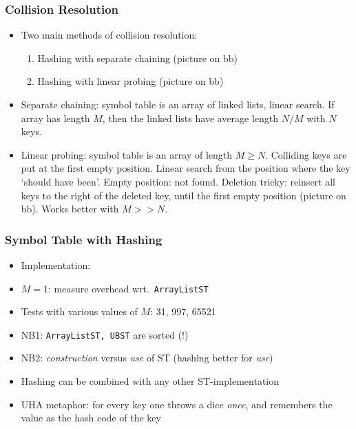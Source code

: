 \documentclass[handout]{beamer}
\newcommand{\git}{https://github.com/marcbezem/INF102/blob/master}
\begin{document}
\begin{frame}
    \frametitle{Collision Resolution}

\begin{itemize}[<+->]
\item Two main methods of collision resolution:
  \begin{enumerate}[<+->]
  \item Hashing with separate chaining (picture on bb)
  \item Hashing with linear probing (picture on bb)
  \end{enumerate}
\item Separate chaining: symbol table is an array of linked lists,
  linear search. If array has length $M$, 
  then the linked lists have average length $N/M$ with $N$ keys.
\item Linear probing: symbol table is an array of length $M\geq N$.
  Colliding keys are put at the first empty position. Linear search from
  the position where the key `should have been'. Empty position: not found.
  Deletion tricky: reinsert all keys to the right of the deleted key, until the first
  empty position (picture on bb). 
  Works better with $M >> N$.
\end{itemize}
\end{frame}

\begin{frame}[fragile]
    \frametitle{Symbol Table with Hashing}

\begin{itemize}[<+->]

\item Implementation: \href{\git/programs/searching/hashTable/ArrayListHashST.java}%
{\color{red}{\tt ArrayListHashST.java}}
\item $M=1$: measure overhead wrt.\ {\tt ArrayListST}
\item Tests with various values of  $M$: 31, 997, 65521
\item NB1: {\tt ArrayListST, UBST} are sorted (!)
\item NB2: \emph{construction} versus \emph{use} of ST (hashing better for \emph{use})
\item Hashing can be combined with any other ST-implementation
\item UHA metaphor: for every key one throws a dice \emph{once}, and remembers
the value as the hash code of the key 
\end{itemize}
\end{frame}
\end{document}
